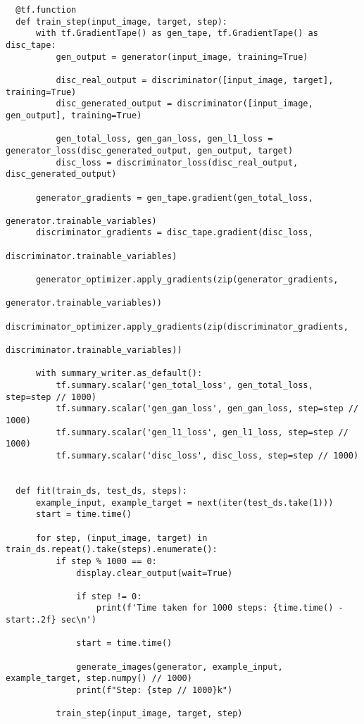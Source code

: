 \begin{lstlisting}
  @tf.function
  def train_step(input_image, target, step):
      with tf.GradientTape() as gen_tape, tf.GradientTape() as disc_tape:
          gen_output = generator(input_image, training=True)

          disc_real_output = discriminator([input_image, target], training=True)
          disc_generated_output = discriminator([input_image, gen_output], training=True)

          gen_total_loss, gen_gan_loss, gen_l1_loss = generator_loss(disc_generated_output, gen_output, target)
          disc_loss = discriminator_loss(disc_real_output, disc_generated_output)

      generator_gradients = gen_tape.gradient(gen_total_loss,
                                              generator.trainable_variables)
      discriminator_gradients = disc_tape.gradient(disc_loss,
                                                   discriminator.trainable_variables)

      generator_optimizer.apply_gradients(zip(generator_gradients,
                                              generator.trainable_variables))
      discriminator_optimizer.apply_gradients(zip(discriminator_gradients,
                                                  discriminator.trainable_variables))

      with summary_writer.as_default():
          tf.summary.scalar('gen_total_loss', gen_total_loss, step=step // 1000)
          tf.summary.scalar('gen_gan_loss', gen_gan_loss, step=step // 1000)
          tf.summary.scalar('gen_l1_loss', gen_l1_loss, step=step // 1000)
          tf.summary.scalar('disc_loss', disc_loss, step=step // 1000)


  def fit(train_ds, test_ds, steps):
      example_input, example_target = next(iter(test_ds.take(1)))
      start = time.time()

      for step, (input_image, target) in train_ds.repeat().take(steps).enumerate():
          if step % 1000 == 0:
              display.clear_output(wait=True)

              if step != 0:
                  print(f'Time taken for 1000 steps: {time.time() - start:.2f} sec\n')

              start = time.time()

              generate_images(generator, example_input, example_target, step.numpy() // 1000)
              print(f"Step: {step // 1000}k")

          train_step(input_image, target, step)


\end{lstlisting}

